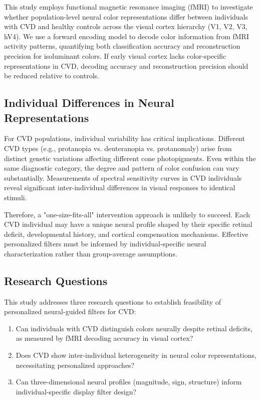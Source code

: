 \documentclass[12pt,a4paper]{article}
\begin{document}
This study employs functional magnetic resonance imaging (fMRI) to investigate whether population-level neural color representations differ between individuals with CVD and healthy controls across the visual cortex hierarchy (V1, V2, V3, hV4). We use a forward encoding model to decode color information from fMRI activity patterns, quantifying both classification accuracy and reconstruction precision for isoluminant colors. If early visual cortex lacks color-specific representations in CVD, decoding accuracy and reconstruction precision should be reduced relative to controls.

\subsection{Individual Differences in Neural Representations}

For CVD populations, individual variability has critical implications. Different CVD types (e.g., protanopia vs. deuteranopia vs. protanomaly) arise from distinct genetic variations affecting different cone photopigments. Even within the same diagnostic category, the degree and pattern of color confusion can vary substantially. Measurements of spectral sensitivity curves in CVD individuals reveal significant inter-individual differences in visual responses to identical stimuli.

Therefore, a "one-size-fits-all" intervention approach is unlikely to succeed. Each CVD individual may have a unique neural profile shaped by their specific retinal deficit, developmental history, and cortical compensation mechanisms. Effective personalized filters must be informed by individual-specific neural characterization rather than group-average assumptions.

\subsection{Research Questions}

This study addresses three research questions to establish feasibility of personalized neural-guided filters for CVD:
\begin{enumerate}
\item Can individuals with CVD distinguish colors neurally despite retinal deficits, as measured by fMRI decoding accuracy in visual cortex?
\item Does CVD show inter-individual heterogeneity in neural color representations, necessitating personalized approaches?
\item Can three-dimensional neural profiles (magnitude, sign, structure) inform individual-specific display filter design?
\end{enumerate}
\end{document}
